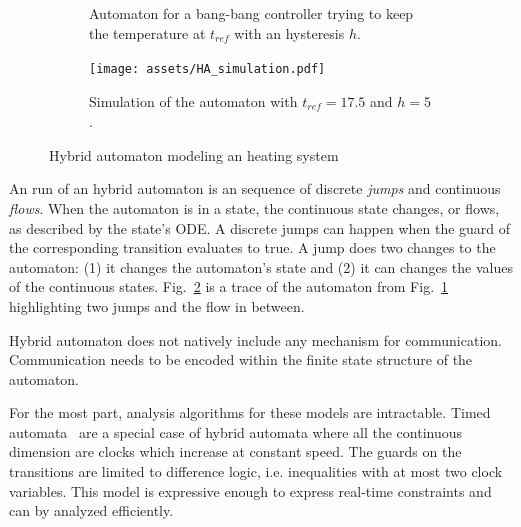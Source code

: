 \documentclass[
graybox,
envcountchap
]{svmult}
\begin{document}
\begin{bibunit}
\begin{figure}
\centering
\begin{subfigure}[b]{0.54\textwidth}
\resizebox{0.95\linewidth}{!}{  }
\caption{Automaton for a bang-bang controller trying to keep the temperature at $t_{\mathit{ref}}$ with an hysteresis $h$.}
\label{fig:HA-ex1-def}
\end{subfigure}
\hfill
\begin{subfigure}[b]{0.40\textwidth}
\texttt{[image: assets/HA\_simulation.pdf]}
\caption{Simulation of the automaton with $t_{\mathit{ref}}=17.5$ and $h = 5$.}
\label{fig:HA-ex1-sim}
\end{subfigure}
\caption{Hybrid automaton modeling an heating system}
\label{fig:HA-ex1}
\end{figure}

An run of an hybrid automaton is an sequence of discrete \emph{jumps} and continuous \emph{flows}.
When the automaton is in a state, the continuous state changes, or flows, as described by the state's ODE.
A discrete jumps can happen when the guard of the corresponding transition evaluates to true.
A jump does two changes to the automaton: (1) it changes the automaton's state and (2) it can changes the values of the continuous states.
Fig.~\ref{fig:HA-ex1-sim} is a trace of the automaton from Fig.~\ref{fig:HA-ex1-def} highlighting two jumps and the flow in between.

Hybrid automaton does not natively include any mechanism for communication.
Communication needs to be encoded within the finite state structure of the automaton.

For the most part, analysis algorithms for these models are intractable.
Timed automata~\cite{DBLP:journals/tcs/AlurD94} are a special case of hybrid automata where all the continuous dimension are clocks which increase at constant speed.
The guards on the transitions are limited to difference logic, i.e. inequalities with at most two clock variables.
This model is expressive enough to express real-time constraints and can by analyzed efficiently. %


\end{bibunit}
\end{document}
